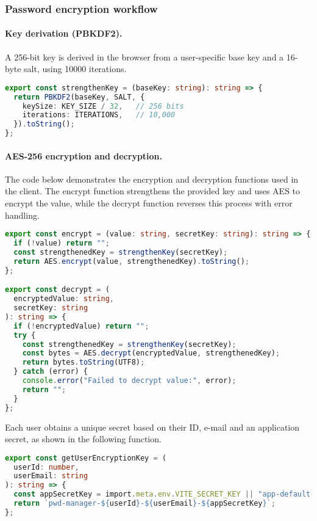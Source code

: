 \subsubsection{Password encryption workflow}

\paragraph{Key derivation (PBKDF2).}
A 256-bit key is derived in the browser from a user-specific base key and a 16-byte salt, using 10000 iterations.

\begin{lstlisting}[language=TypeScript, caption={Key derivation function using PBKDF2}, label={lst:strengthen-key}]
export const strengthenKey = (baseKey: string): string => {
  return PBKDF2(baseKey, SALT, {
    keySize: KEY_SIZE / 32,   // 256 bits
    iterations: ITERATIONS,   // 10,000
  }).toString();
};
\end{lstlisting}

\paragraph{AES-256 encryption and decryption.}
The code below demonstrates the encryption and decryption functions used in the client. The encrypt function strengthens the provided key and uses AES to encrypt the value, while the decrypt function reverses this process with error handling.

\begin{lstlisting}[language=TypeScript, caption={AES-256 encryption and decryption functions}, label={lst:encrypt-decrypt}]
export const encrypt = (value: string, secretKey: string): string => {
  if (!value) return "";
  const strengthenedKey = strengthenKey(secretKey);
  return AES.encrypt(value, strengthenedKey).toString();
};

export const decrypt = (
  encryptedValue: string,
  secretKey: string
): string => {
  if (!encryptedValue) return "";
  try {
    const strengthenedKey = strengthenKey(secretKey);
    const bytes = AES.decrypt(encryptedValue, strengthenedKey);
    return bytes.toString(UTF8);
  } catch (error) {
    console.error("Failed to decrypt value:", error);
    return "";
  }
};
\end{lstlisting}

Each user obtains a unique secret based on their ID, e-mail and an application secret, as shown in the following function.

\begin{lstlisting}[language=TypeScript, caption={User-specific encryption key generation}, label={lst:user-key}]
export const getUserEncryptionKey = (
  userId: number,
  userEmail: string
): string => {
  const appSecretKey = import.meta.env.VITE_SECRET_KEY || "app-default-key";
  return `pwd-manager-${userId}-${userEmail}-${appSecretKey}`;
};
\end{lstlisting}

